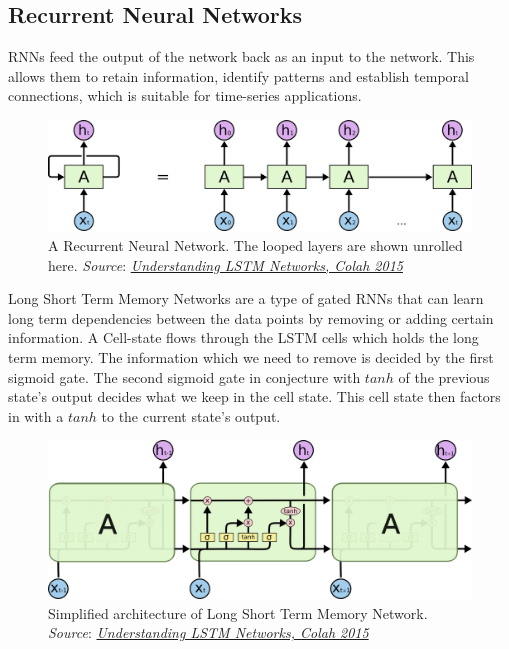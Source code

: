 \subsection{Recurrent Neural Networks}
RNNs feed the output of the network back as an input to the network. This allows them to retain information, identify patterns and establish temporal connections, which is suitable for time-series applications.
\begin{figure}[h]
    \centering
    \includegraphics[scale=0.3]{Images/RNNs_1.png}
    \caption{A Recurrent Neural Network. The looped layers are shown unrolled here. \emph{Source}: \href{https://colah.github.io/posts/2015-08-Understanding-LSTMs/}{\textit{Understanding LSTM Networks, Colah 2015}}}
    \label{fig:RNN}
\end{figure}
Long Short Term Memory Networks are a type of gated RNNs that can learn long term dependencies between the data points by removing or adding certain information. A Cell-state flows through the LSTM cells which holds the long term memory. The information which we need to remove is decided by the first sigmoid gate. The second sigmoid gate in conjecture with $tanh$ of the previous state's output decides what we keep in the cell state. This cell state then factors in with a $tanh$ to the current state's output.
\begin{figure}[h]
    \centering
    \includegraphics[scale=0.35]{Images/LSTM.png}
    \caption{Simplified architecture of Long Short Term Memory Network. \emph{Source}: \href{https://colah.github.io/posts/2015-08-Understanding-LSTMs/}{\textit{Understanding LSTM Networks, Colah 2015}}}
    \label{fig:LSTM}
\end{figure}
\vspace{-0.3in}
